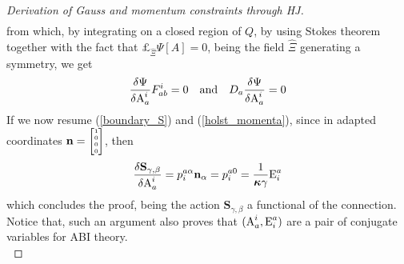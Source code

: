 \begin{proof}[Derivation of Gauss and momentum constraints through HJ]
\begin{align*}
    \end{align*}
{from which, by integrating on a closed region of $Q$, by using Stokes theorem together with the fact that $\pounds_{\widehat{\Xi}}\Psi[A]=0$, being the field $\widehat{\Xi}$ generating a symmetry, we get}
    $$
        \frac{\delta\Psi}{\delta\text{\normalfont A}^i_a}F^i_{ab}=0 \quad\text{and}\quad D_a\frac{\delta\Psi}{\delta\text{\normalfont A}^i_a}=0
   $$
   If we now resume (\ref{boundary_S}) and (\ref{holst_momenta}), since in adapted coordinates $\mathbf{n}=\tiny\begin{bmatrix}
        1\\0\\0\\0
    \end{bmatrix}$, then
    $$\frac{\delta\mathbf{S}_{\gamma,\beta}}{\delta\text{\normalfont A}^i_a}=p_i^{a\alpha}\mathbf{n}_\alpha=p_i^{a0}=\frac{1}{\boldsymbol{\kappa}\gamma}\text{\normalfont E}^a_i$$ 
    which concludes the proof, being the action $\mathbf{S}_{\gamma,\beta}$ a functional of the connection.\, Notice that, such an argument also proves that $(\text{\normalfont A}^i_a,\text{\normalfont E}_i^a)$ are a pair of conjugate variables for ABI theory.\\
    \,\newline
\end{proof}




